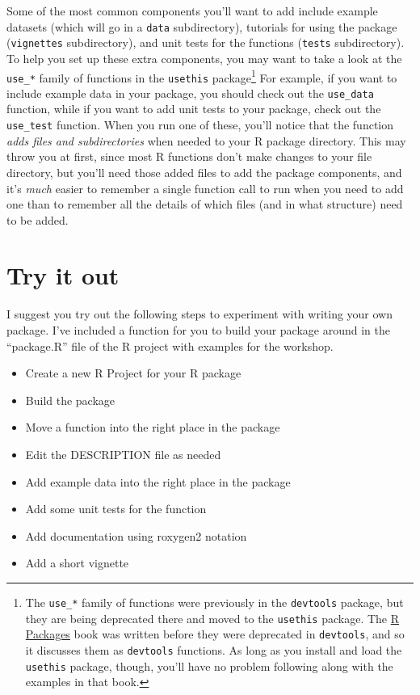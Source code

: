 \documentclass[]{tufte-book}
\providecommand{\tightlist}{%
  \setlength{\itemsep}{0pt}\setlength{\parskip}{0pt}}
\begin{document}
Some of the most common components you'll want to add include example datasets
(which will go in a \texttt{data} subdirectory), tutorials for using the package
(\texttt{vignettes} subdirectory), and unit tests for the functions (\texttt{tests}
subdirectory). To help you set up these extra components, you may want to take a
look at the \texttt{use\_*} family of functions in the \texttt{usethis} \citep{R-usethis}
package\footnote{The \texttt{use\_*} family of functions were previously in the \texttt{devtools}
  package, but they are being deprecated there and moved to the \texttt{usethis} package.
  The \href{http://r-pkgs.had.co.nz/}{R Packages} book was written before they were
  deprecated in \texttt{devtools}, and so it discusses them as \texttt{devtools} functions. As
  long as you install and load the \texttt{usethis} package, though, you'll have no
  problem following along with the examples in that book.} For example, if you
want to include example data in your package, you should check out the
\texttt{use\_data} function, while if you want to add unit tests to your package, check
out the \texttt{use\_test} function. When you run one of these, you'll notice that the
function \emph{adds files and subdirectories} when needed to your R package
directory. This may throw you at first, since most R functions don't make
changes to your file directory, but you'll need those added files to add the
package components, and it's \emph{much} easier to remember a single function call to
run when you need to add one than to remember all the details of which files (and
in what structure) need to be added.

\hypertarget{try-it-out-1}{%
\section{Try it out}\label{try-it-out-1}}

I suggest you try out the following steps to experiment with
writing your own package. I've included a function for you to build
your package around in the ``package.R'' file of the R project with
examples for the workshop.

\begin{itemize}
\tightlist
\item
  Create a new R Project for your R package
\item
  Build the package
\item
  Move a function into the right place in the package
\item
  Edit the DESCRIPTION file as needed
\item
  Add example data into the right place in the package
\item
  Add some unit tests for the function
\item
  Add documentation using roxygen2 notation
\item
  Add a short vignette
\end{itemize}
\end{document}
